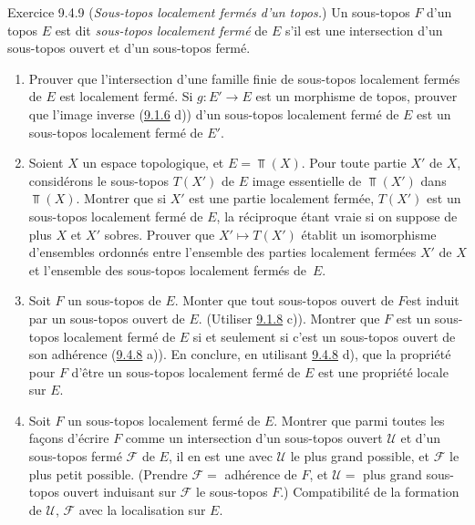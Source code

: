 \begin{enonce*}[remark]{Exercice 9.4.9}
(\emph{Sous-topos localement fermés d'un topos.}) Un sous-topos $F$
d'un topos $E$ est dit \emph{sous-topos localement fermé} de $E$
s'il est une intersection d'un sous-topos ouvert et d'un sous-topos
fermé.
\begin{enumerate}
\renewcommand{\theenumi}{\alph{enumi}}
\renewcommand{\labelenumi}{\theenumi)}
\item Prouver que l'intersection d'une famille finie de sous-topos
localement fermés de $E$ est localement fermé. Si $g:E'\rightarrow
E$ est un morphisme de topos, prouver que l'image inverse
(\hyperref[IV.exer9.1.6]{9.1.6} d)) d'un sous-topos localement fermé de $E$ est
un sous-topos localement fermé de $E'$.

\item Soient $X$ un espace topologique, et $E=\Top(X)$. Pour toute
partie $X'$ de $X$, considérons le sous-topos $T(X')$ de $E$ image
essentielle de $\Top(X')$ dans $\Top(X)$. Montrer que si $X'$ est
une partie localement fermée, $T(X')$ est un sous-topos localement
fermé de $E$, la réciproque étant vraie si on suppose de plus $X$ et
$X'$ sobres. Prouver que $X'\mapsto T(X')$ établit un isomorphisme
d'ensembles ordonnés entre l'ensemble des parties localement fermées
$X'$ de $X$ et l'ensemble des sous-topos localement fermés de~$E$.

\item Soit $F$ un sous-topos de $E$. Monter que tout sous-topos ouvert
de $F$\pageoriginale est induit par un sous-topos ouvert de $E$.
(Utiliser \hyperref[IV.exer9.1.8]{9.1.8} c)). Montrer que $F$ est un sous-topos
localement fermé de $E$ si et seulement si c'est un sous-topos
ouvert de son adhérence (\hyperref[IV.exer9.4.8]{9.4.8} a)). En conclure, en
utilisant \hyperref[IV.exer9.4.8]{9.4.8} d), que la propriété pour $F$
d'être un
sous-topos localement fermé de $E$ est une propriété
locale sur $E$.

\item Soit $F$ un sous-topos localement fermé de $E$. Montrer que
parmi toutes les façons d'écrire $F$ comme un intersection d'un
sous-topos ouvert $\mathcal{U}$ et d'un sous-topos fermé
$\mathcal{F}$ de $E$, il en est une avec $\mathcal{U}$ le plus grand
possible, et $\mathcal{F}$ le plus petit possible. (Prendre
$\mathcal{F} =$ adhérence de $F$, et $\mathcal{U} =$ plus grand
sous-topos ouvert induisant sur $\mathcal{F}$ le sous-topos $F$.)
Compatibilité de la formation de $\mathcal{U}$, $\mathcal{F}$ avec
la localisation sur $E$.
\end{enumerate}
\end{enonce*}

